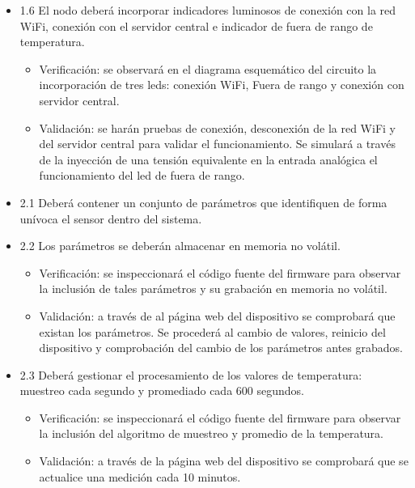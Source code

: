 \documentclass[11pt]{charter}
\begin{document}
\begin{itemize}
\item 1.6 El nodo deberá incorporar indicadores luminosos de conexión con la red WiFi, conexión con el servidor central e indicador de fuera de rango de temperatura.

\begin{itemize}
\item Verificación: se observará en el diagrama esquemático del circuito la incorporación de tres leds: conexión WiFi, Fuera de rango y conexión con servidor central.
\item Validación: se harán pruebas de conexión, desconexión de la red WiFi y del servidor central para validar el funcionamiento. Se simulará a través de la inyección de una tensión equivalente en la entrada analógica el funcionamiento del led de fuera de rango.
\end{itemize}

\item 2.1 Deberá contener un conjunto de parámetros que identifiquen de forma unívoca el sensor dentro del sistema.
\item 2.2 Los parámetros se deberán almacenar en memoria no volátil.


\begin{itemize}
\item Verificación: se inspeccionará el código fuente del firmware para observar la inclusión de tales parámetros y su grabación en memoria no volátil.
\item Validación: a través de al página web del dispositivo se comprobará que existan los parámetros. Se procederá al cambio de valores, reinicio del dispositivo y comprobación del cambio de los parámetros antes grabados.
\end{itemize}

\item 2.3 Deberá gestionar el procesamiento de los valores de temperatura: muestreo cada segundo y promediado cada 600 segundos.
\begin{itemize}
\item Verificación: se inspeccionará el código fuente del firmware para observar la inclusión del algoritmo de muestreo y promedio de la temperatura.
\item Validación: a través de la página web del dispositivo se comprobará que se actualice una medición cada 10 minutos.
\end{itemize}


\end{itemize}
\end{document}
